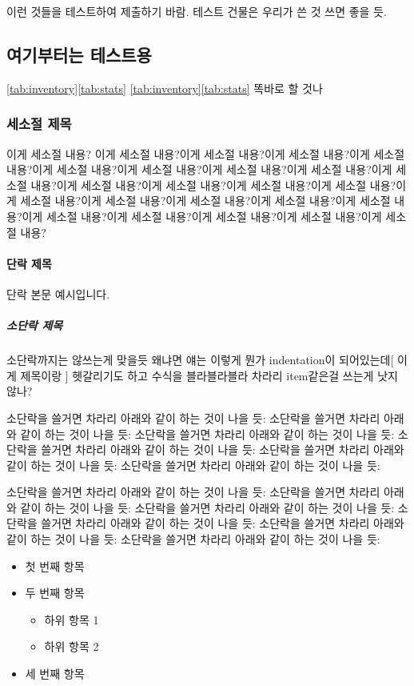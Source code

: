 이런 것들을 테스트하여 제출하기 바람. 테스트 건물은 우리가 쓴 것 쓰면 좋을 듯.




\subsection{여기부터는 테스트용}
 \ref{tab:inventory}\을 \ref{tab:stats}\을
 \ref{tab:inventory}\은 \ref{tab:stats}\은
똑바로 할 것\을 나\을

\subsubsection{세소절 제목}
이게 세소절 내용? 이게 세소절 내용?이게 세소절 내용?이게 세소절 내용?이게 세소절 내용?이게 세소절 내용?이게 세소절 내용?이게 세소절 내용?이게 세소절 내용?이게 세소절 내용?이게 세소절 내용?이게 세소절 내용?이게 세소절 내용?이게 세소절 내용?이게 세소절 내용?이게 세소절 내용?이게 세소절 내용?이게 세소절 내용?이게 세소절 내용?이게 세소절 내용?이게 세소절 내용?이게 세소절 내용?이게 세소절 내용?이게 세소절 내용?

\paragraph{단락 제목}  
단락 본문 예시입니다.

\subparagraph{소단락 제목}  
소단락까지는 않쓰는게 맞을듯 왜냐면 얘는 이렇게 뭔가 indentation이 되어있는데[ 이게 제목이랑 ] 헷갈리기도 하고 수식을 블라블라블라 차라리 item같은걸 쓰는게 낫지 않나?

소단락을 쓸거면 차라리 아래와 같이 하는 것이 나을 듯: 소단락을 쓸거면 차라리 아래와 같이 하는 것이 나을 듯: 소단락을 쓸거면 차라리 아래와 같이 하는 것이 나을 듯: 소단락을 쓸거면 차라리 아래와 같이 하는 것이 나을 듯: 소단락을 쓸거면 차라리 아래와 같이 하는 것이 나을 듯: 소단락을 쓸거면 차라리 아래와 같이 하는 것이 나을 듯:

소단락을 쓸거면 차라리 아래와 같이 하는 것이 나을 듯: 소단락을 쓸거면 차라리 아래와 같이 하는 것이 나을 듯: 소단락을 쓸거면 차라리 아래와 같이 하는 것이 나을 듯: 소단락을 쓸거면 차라리 아래와 같이 하는 것이 나을 듯: 소단락을 쓸거면 차라리 아래와 같이 하는 것이 나을 듯: 소단락을 쓸거면 차라리 아래와 같이 하는 것이 나을 듯:
\begin{itemize}
  \item 첫 번째 항목
  \item 두 번째 항목
    \begin{itemize}
      \item 하위 항목 1
      \item 하위 항목 2
    \end{itemize}
  \item 세 번째 항목
\end{itemize}


